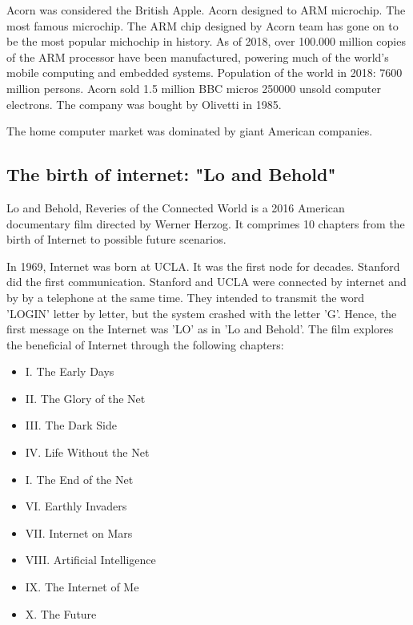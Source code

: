     
    
 Acorn was considered the British Apple.    
 Acorn designed to ARM microchip. The most famous microchip.
 The ARM chip designed by Acorn team has gone on to be the most popular michochip in history.  
 As of 2018, over 100.000 million copies of the ARM processor have been manufactured, powering much of the world's mobile computing and 
 embedded systems. Population of the world in 2018: 7600 million persons. 
 Acorn sold 1.5 million BBC micros 
 250000 unsold computer electrons.     
 The company was bought by Olivetti in 1985. 
      
    
 The home computer market was dominated by giant American companies. 
       
  
 
    
   
    
\subsection*{The birth of internet: "Lo and Behold"} 
 Lo and Behold, Reveries of the Connected World is a 2016 American documentary film 
 directed by Werner Herzog. It comprimes 10 chapters from the birth of Internet to possible future 
 scenarios. 
 
 In 1969, Internet was born at UCLA.   
 It was the first node for decades. 
 Stanford did the first communication. 
 Stanford and UCLA were connected by internet and by by a telephone at the same time.  
 They intended to transmit the word 'LOGIN' letter by letter,  
 but the system crashed with the letter 'G'. 
 Hence, the first message on the Internet was 'LO' as in 'Lo and Behold'.    
 The film explores the beneficial of  Internet through the following chapters: 
 \begin{itemize} 
 \setlength\itemsep{0cm}
 \item I. The Early Days
 \item II.  The Glory of the Net
 \item III. The Dark Side
 \item IV. Life Without the Net
 \item I. The End of the Net
 \item VI.  Earthly Invaders
 \item VII.  Internet on Mars
 \item VIII.  Artificial Intelligence
 \item IX. The Internet of Me
 \item X. The Future
 \end{itemize} 
 
